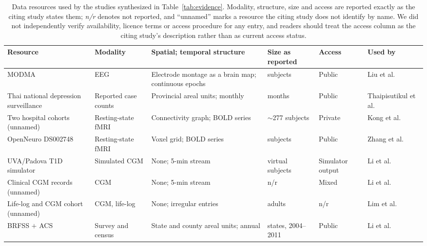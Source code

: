 \documentclass[journal]{IEEEtran}
\newif\ifsubmission
\begin{document}
\ifsubmission\else
\begin{table}[p]
\centering
\caption{Data resources used by the studies synthesized in Table~\ref{tab:evidence}. Modality, structure, size and access are reported exactly as the citing study states them; \emph{n/r} denotes not reported, and ``unnamed'' marks a resource the citing study does not identify by name. We did not independently verify availability, licence terms or access procedure for any entry, and readers should treat the access column as the citing study's description rather than as current access status.}
\label{tab:datasets}
\scriptsize
\setlength{\tabcolsep}{4pt}
\renewcommand{\arraystretch}{1.12}
\begin{tabularx}{\textwidth}{>{\raggedright\arraybackslash}p{4.0cm} >{\raggedright\arraybackslash}p{2.2cm} >{\raggedright\arraybackslash}X >{\raggedright\arraybackslash}p{2.5cm} >{\raggedright\arraybackslash}p{1.7cm} >{\raggedright\arraybackslash}p{2.8cm}}
\toprule
\textbf{Resource} & \textbf{Modality} & \textbf{Spatial; temporal structure} & \textbf{Size as reported} & \textbf{Access} & \textbf{Used by} \\
\midrule
MODMA & EEG & Electrode montage as a brain map; continuous epochs & 53 subjects & Public & Liu et al.~\cite{2} \\
\addlinespace[1pt]
\rowcolor{tablestripe}Thai national depression surveillance & Reported case counts & Provincial areal units; monthly & 70 months & Public & Thaipisutikul et al.~\cite{3} \\
\addlinespace[1pt]
Two hospital cohorts (unnamed) & Resting-state fMRI & Connectivity graph; BOLD series & $\sim$277 subjects & Private & Kong et al.~\cite{4} \\
\addlinespace[1pt]
\rowcolor{tablestripe}OpenNeuro DS002748 & Resting-state fMRI & Voxel grid; BOLD series & 72 subjects & Public & Zhang et al.~\cite{9} \\
\addlinespace[1pt]
UVA/Padova T1D simulator & Simulated CGM & None; 5-min stream & 10 virtual subjects & Simulator output & Li et al.~\cite{Li2020GluNet} \\
\addlinespace[1pt]
\rowcolor{tablestripe}Clinical CGM records (unnamed) & CGM & None; 5-min stream & n/r & Mixed & Li et al.~\cite{Li2020GluNet} \\
\addlinespace[1pt]
Life-log and CGM cohort (unnamed) & CGM, life-log & None; irregular entries & 171 adults & n/r & Lim et al.~\cite{Lim2025VirtualCGM} \\
\addlinespace[1pt]
\rowcolor{tablestripe}BRFSS $+$ ACS & Survey and census & State and county areal units; annual & 48 states, 2004--2011 & Public & Li et al.~\cite{XiaoLi2016DiabetesSpatiotemporal} \\

\end{tabularx}
\end{table}
\end{document}
